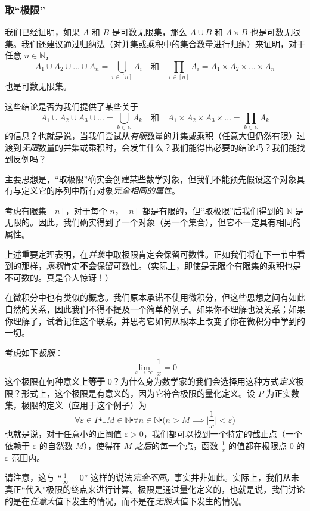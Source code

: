 \subsubsection*{取``极限''}

我们已经证明，如果 $A$ 和 $B$ 是可数无限集，那么 $A \cup B$ 和 $A \times B$ 也是可数无限集。我们还建议通过归纳法（对并集或乘积中的集合数量进行归纳）来证明，对于任意 $n \in \mathbb{N}$，
\[A_1 \cup A_2 \cup \dots \cup A_n = \bigcup_{i \in [n]} A_i \quad \text{和} \quad \prod_{i \in [n]} A_i = A_1 \times A_2 \times \dots \times A_n\] 
也是可数无限集。

这些结论是否为我们提供了某些关于
\[A_1 \cup A_2 \cup A_3 \cup \dots = \bigcup_{k \in \mathbb{N}} A_k \quad \text{和} \quad A_1 \times A_2 \times A_3 \times \dots = \prod_{k \in \mathbb{N}} A_k\]
的信息？也就是说，当我们尝试从\emph{有限}数量的并集或乘积（任意大但仍然有限）过渡到\emph{无限}数量的并集或乘积时，会发生什么？我们能得出必要的结论吗？我们能找到反例吗？

主要思想是，``取极限''确实会创建某些数学对象，但我们不能预先假设这个对象具有与定义它的序列中所有对象\emph{完全相同的属性}。

考虑有限集 $[n]$，对于每个 $n$，$[n]$ 都是有限的，但``取极限''后我们得到的 $\mathbb{N}$ 是无限的。因此，我们确实得到了一个对象（另一个集合），但它不一定具有相同的属性。

上述重要定理表明，在\emph{并集}中取极限肯定会保留可数性。正如我们将在下一节中看到的那样，\emph{乘积}肯定\textbf{不会}保留可数性。（实际上，即使是无限个有限集的乘积也是不可数的。真是令人惊讶！）

在微积分中也有类似的概念。我们原本承诺不使用微积分，但这些思想之间有如此自然的关系，因此我们不得不提及一个简单的例子。如果你不理解也没关系；如果你理解了，试着记住这个联系，并思考它如何从根本上改变了你在微积分中学到的一切。

考虑如下\emph{极限}：
\[\lim_{x \to \infty} \frac{1}{x} = 0\]
这个极限在何种意义上\textbf{等于} $0$？为什么身为数学家的我们会选择用这种方式\emph{定义}极限？形式上，这个极限是有意义的，因为它符合极限的量化定义。设 $P$ 为正实数集，极限的定义（应用于这个例子）为
\[\forall \varepsilon \in P \centerdot \exists M \in \mathbb{N} \centerdot \forall n \in \mathbb{N} \centerdot \big(n > M \implies \big|\frac{1}{x}\big| < \varepsilon \big)\]
也就是说，对于任意小的正阈值 $\varepsilon > 0$，我们都可以找到一个特定的截止点（一个依赖于 $\varepsilon$ 的自然数 $M$），使得在 $M$ \emph{之后}的每一个点，函数 $\frac{1}{x}$ 的值都在极限点 $0$ 的 $\varepsilon$ 范围内。

请注意，这与 ``$\frac{1}{\infty} = 0$'' 这样的说法\emph{完全不同}。事实并非如此。实际上，我们从未真正``代入''极限的终点来进行计算。极限是通过量化定义的，也就是说，我们讨论的是在\emph{任意大}值下发生的情况，而不是在\emph{无限大}值下发生的情况。
